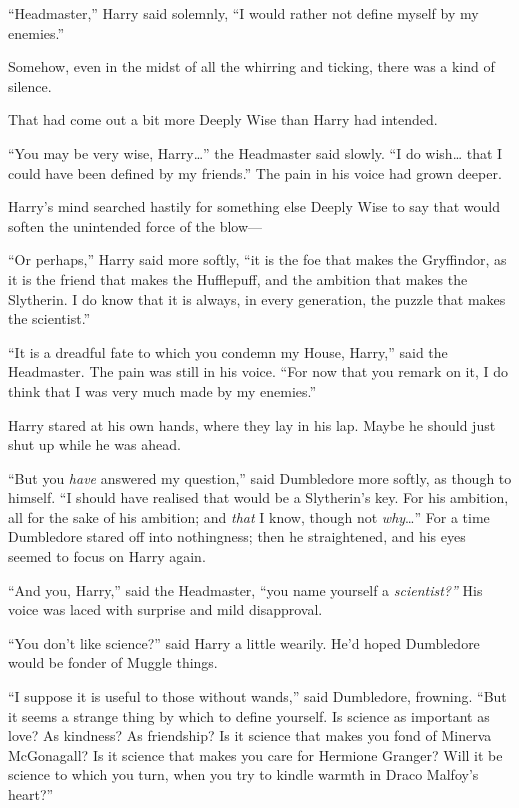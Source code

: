 ``Headmaster,'' Harry said solemnly, ``I would rather not define myself
by my enemies.''

Somehow, even in the midst of all the whirring and ticking, there was a
kind of silence.

That had come out a bit more Deeply Wise than Harry had intended.

``You may be very wise, Harry\ldots{}'' the Headmaster said slowly. ``I
do wish\ldots{} that I could have been defined by my friends.'' The pain
in his voice had grown deeper.

Harry's mind searched hastily for something else Deeply Wise to say that
would soften the unintended force of the blow---

``Or perhaps,'' Harry said more softly, ``it is the foe that makes the
Gryffindor, as it is the friend that makes the Hufflepuff, and the
ambition that makes the Slytherin. I do know that it is always, in every
generation, the puzzle that makes the scientist.''

``It is a dreadful fate to which you condemn my House, Harry,'' said the
Headmaster. The pain was still in his voice. ``For now that you remark
on it, I do think that I was very much made by my enemies.''

Harry stared at his own hands, where they lay in his lap. Maybe he
should just shut up while he was ahead.

``But you \emph{have} answered my question,'' said Dumbledore more
softly, as though to himself. ``I should have realised that would be a
Slytherin's key. For his ambition, all for the sake of his ambition; and
\emph{that} I know, though not \emph{why}\ldots{}'' For a time
Dumbledore stared off into nothingness; then he straightened, and his
eyes seemed to focus on Harry again.

``And you, Harry,'' said the Headmaster, ``you name yourself a
\emph{scientist?''} His voice was laced with surprise and mild
disapproval.

``You don't like science?'' said Harry a little wearily. He'd hoped
Dumbledore would be fonder of Muggle things.

``I suppose it is useful to those without wands,'' said Dumbledore,
frowning. ``But it seems a strange thing by which to define yourself. Is
science as important as love? As kindness? As friendship? Is it science
that makes you fond of Minerva McGonagall? Is it science that makes you
care for Hermione Granger? Will it be science to which you turn, when
you try to kindle warmth in Draco Malfoy's heart?''

